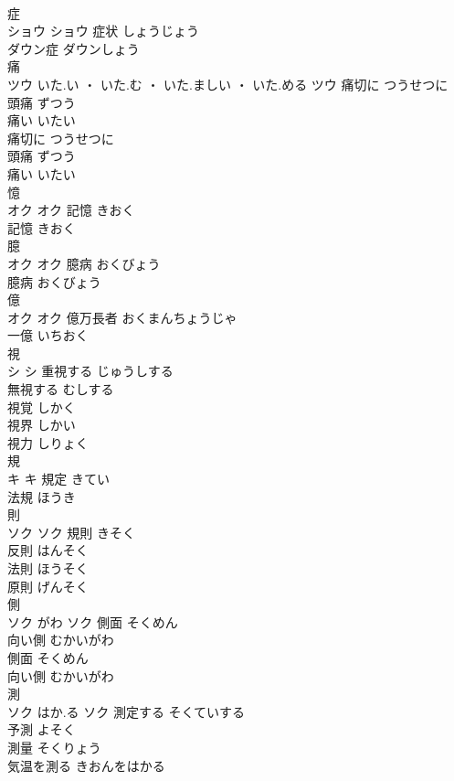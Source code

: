 \documentclass[8pt]{extreport}
\begin{document}
\begin{CJK}{UTF8}{min}
\\	症	
\\	ショウ		ショウ	症状	しょうじょう	
\\	ダウン症	ダウンしょう	
\\	痛	
\\	ツウ	いた.い ・ いた.む ・ いた.ましい ・ いた.める	ツウ	痛切に	つうせつに	
\\	頭痛	ずつう	
\\	痛い	いたい	
\\	痛切に	つうせつに	
\\	頭痛	ずつう	
\\	痛い	いたい	
\\	憶	
\\	オク		オク	記憶	きおく	
\\	記憶	きおく	
\\	臆	
\\	オク		オク	臆病	おくびょう	
\\	臆病	おくびょう	
\\	億	
\\	オク		オク													億万長者	おくまんちょうじゃ	
\\	一億	いちおく	
\\	視	
\\	シ		シ	重視する	じゅうしする	
\\	無視する	むしする	
\\	視覚	しかく	
\\	視界	しかい	
\\	視力	しりょく	
\\	規	
\\	キ		キ	規定	きてい	
\\	法規	ほうき	
\\	則	
\\	ソク		ソク	規則	きそく	
\\	反則	はんそく	
\\	法則	ほうそく	
\\	原則	げんそく	
\\	側	
\\	ソク	がわ	ソク	側面	そくめん	
\\	向い側	むかいがわ	
\\	側面	そくめん	
\\	向い側	むかいがわ	
\\	測	
\\	ソク	はか.る	ソク	測定する	そくていする	
\\	予測	よそく	
\\	測量	そくりょう	
\\	気温を測る	きおんをはかる	

\end{CJK}
\end{document}
